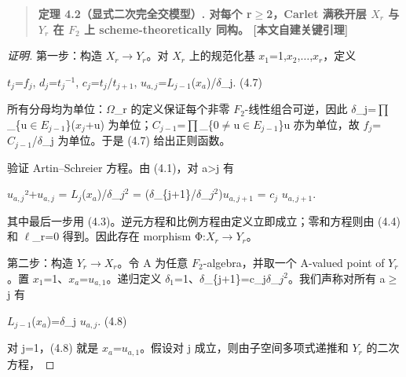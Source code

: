 \documentclass[11pt]{ctexart}
\begin{document}
\begin{quote}\textbf{定理 4.2（显式二次完全交模型）. 对每个 r\ensuremath{\ge}2，Carlet 满秩开层 \ensuremath{X_{r}} 与 \ensuremath{Y_{r}} 在 \ensuremath{F_2} 上 scheme-theoretically 同构。  [本文自建关键引理]}\end{quote}

\begin{proof}[证明] 

第一步：构造 \ensuremath{X_{r}}\ensuremath{\to}\ensuremath{Y_{r}}。对 \ensuremath{X_{r}} 上的规范化基 \ensuremath{x_1}=1,\ensuremath{x_2},\ensuremath{\ldots},\ensuremath{x_{r}}，定义

\ensuremath{t_{j}}=\ensuremath{f_{j}},    \ensuremath{d_{j}}=\ensuremath{t_{j}}\ensuremath{^{-1}},    \ensuremath{c_{j}}=\ensuremath{t_{j}}/\ensuremath{t_{j+1}},    \ensuremath{u_{a,j}}=\ensuremath{L_{j−1}}(\ensuremath{x_{a}})/\ensuremath{\delta}\_j.    (4.7)

所有分母均为单位：\ensuremath{\Omega}\_r 的定义保证每个非零 \ensuremath{F_2}-线性组合可逆，因此 \ensuremath{\delta}\_j=\ensuremath{\prod}\_\{u\ensuremath{\in}\ensuremath{E_{j−1}}\}(\ensuremath{x_{j}}+u) 为单位；\ensuremath{C_{j−1}}=\ensuremath{\prod}\_\{0\ensuremath{\ne}u\ensuremath{\in}\ensuremath{E_{j−1}}\}u 亦为单位，故 \ensuremath{f_{j}}=\ensuremath{C_{j−1}}/\ensuremath{\delta}\_j 为单位。于是 (4.7) 给出正则函数。

验证 Artin–Schreier 方程。由 (4.1)，对 a>j 有

\ensuremath{u_{a,j}}²+\ensuremath{u_{a,j}} = \ensuremath{L_{j}}(\ensuremath{x_{a}})/\ensuremath{\delta}\_\ensuremath{j^2} = (\ensuremath{\delta}\_\{j+1\}/\ensuremath{\delta}\_\ensuremath{j^2})\ensuremath{u_{a,j+1}} = \ensuremath{c_{j}} \ensuremath{u_{a,j+1}}.

其中最后一步用 (4.3)。逆元方程和比例方程由定义立即成立；零和方程则由 (4.4) 和 \ensuremath{\ell}\_r=0 得到。因此存在 morphism Φ:\ensuremath{X_{r}}\ensuremath{\to}\ensuremath{Y_{r}}。

第二步：构造 \ensuremath{Y_{r}}\ensuremath{\to}\ensuremath{X_{r}}。令 A 为任意 \ensuremath{F_2}-algebra，并取一个 A-valued point of \ensuremath{Y_{r}}。置 \ensuremath{x_1}=1、\ensuremath{x_{a}}=\ensuremath{u_{a,1}}。递归定义 \ensuremath{\ensuremath{\delta}_1}=1、\ensuremath{\delta}\_\{j+1\}=c\_j\ensuremath{\delta}\_\ensuremath{j^2}。我们声称对所有 a\ensuremath{\ge}j 有

\ensuremath{L_{j−1}}(\ensuremath{x_{a}})=\ensuremath{\delta}\_j \ensuremath{u_{a,j}}.    (4.8)

对 j=1，(4.8) 就是 \ensuremath{x_{a}}=\ensuremath{u_{a,1}}。假设对 j 成立，则由子空间多项式递推和 \ensuremath{Y_{r}} 的二次方程，


\end{proof}
\end{document}
